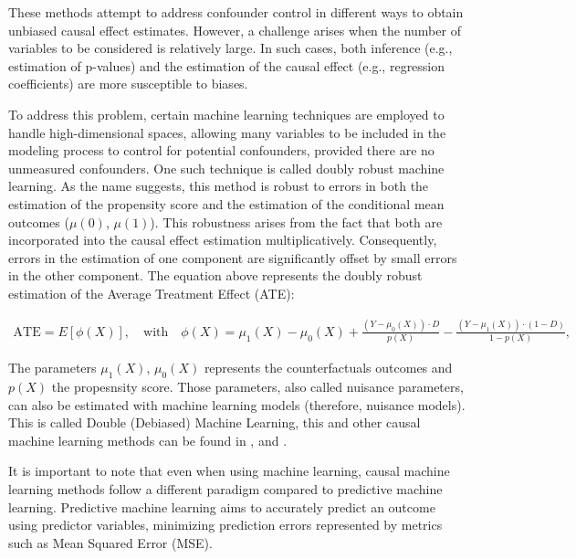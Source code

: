 These methods attempt to address confounder control in different ways to obtain unbiased causal effect estimates. However, a challenge arises when the number of variables to be considered is relatively 
large. In such cases, both inference (e.g., estimation of p-values) and the estimation of the causal effect (e.g., regression coefficients) are more susceptible to biases.

To address this problem, certain machine learning techniques are employed to handle high-dimensional spaces, allowing many variables to be included in the modeling process to control for potential confounders, 
provided there are no unmeasured confounders. One such technique is called doubly robust machine learning. As the name suggests, this method is robust to errors in both the estimation of the propensity score and 
the estimation of the conditional mean outcomes ($\mu(0)$, $\mu(1)$). This robustness arises from the fact that both are incorporated into the causal effect estimation multiplicatively. Consequently, errors in the 
estimation of one component are significantly offset by small errors in the other component. The equation above represents the doubly robust estimation of the Average Treatment Effect (\gls{ATE}):

\begin{equation}
  \begin{aligned}
    \text{ATE} = E[\phi(X)], \quad \text{with} \quad \phi(X) = \mu_1(X) - \mu_0(X) + \frac{(Y - \mu_0(X)) \cdot D}{p(X)} - \frac{(Y - \mu_1(X)) \cdot (1 - D)}{1 - p(X)},
  \end{aligned}
  \label{eq:dr_ate}
\end{equation}

The parameters $\mu_1(X)$, $\mu_0(X)$ represents the counterfactuals outcomes and $p(X)$ the propesnsity score. Those parameters, also called nuisance parameters, can also be estimated with machine learning models (therefore, nuisance models).
This is called Double (Debiased) Machine Learning, this and other causal machine learning methods can be found in \textcite{chernozhukov_doubledebiased_2016}, \textcite{chernozhukov_applied_2024} and \textcite{athey_machine_2019}.

It is important to note that even when using machine learning, causal machine learning methods follow a different paradigm compared to predictive machine learning. Predictive machine learning aims to accurately predict an outcome using 
predictor variables, minimizing prediction errors represented by metrics such as Mean Squared Error (MSE).

